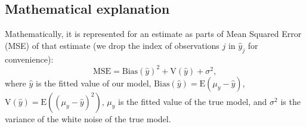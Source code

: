 \documentclass[
]{book}
\theoremstyle{definition}
\theoremstyle{definition}
\theoremstyle{definition}
\theoremstyle{definition}
\theoremstyle{remark}
\begin{document}
\subsection{Mathematical explanation}\label{mathematical-explanation}

Mathematically, it is represented for an estimate as parts of Mean Squared Error (MSE) of that estimate (we drop the index of observations \(j\) in \(\hat{y}_j\) for convenience):
\begin{equation}
    \mathrm{MSE} = \mathrm{Bias}(\hat{y})^2 + \mathrm{V}(\hat{y}) + \sigma^2 ,
    \label{eq:biasVariance01}
\end{equation}
where \(\hat{y}\) is the fitted value of our model, \(\mathrm{Bias}(\hat{y})=\mathrm{E}(\mu_y-\hat{y})\), \(\mathrm{V}(\hat{y})=\mathrm{E}\left((\mu_y-\hat{y})^2\right)\), \(\mu_y\) is the fitted value of the true model, and \(\sigma^2\) is the variance of the white noise of the true model.
\end{document}
